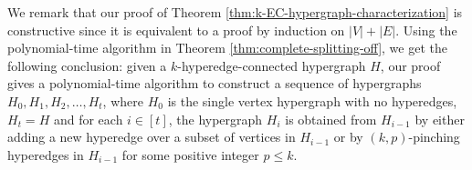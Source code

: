 We remark that our proof of Theorem \ref{thm:k-EC-hypergraph-characterization} is constructive since it is equivalent to a proof by induction on $|V|+|E|$. 
Using the polynomial-time algorithm in Theorem \ref{thm:complete-splitting-off}, we get the following conclusion: given a $k$-hyperedge-connected hypergraph $H$, our proof gives a polynomial-time algorithm to construct a sequence of hypergraphs $H_0, H_1, H_2, \ldots, H_t$, where $H_0$ is the single vertex hypergraph with no hyperedges, $H_t=H$ and for each $i\in [t]$, the hypergraph $H_i$ is obtained from $H_{i-1}$ by either adding a new hyperedge over a subset of vertices in $H_{i-1}$ or by $(k,p)$-pinching hyperedges in $H_{i-1}$ for some positive integer $p\le k$. 